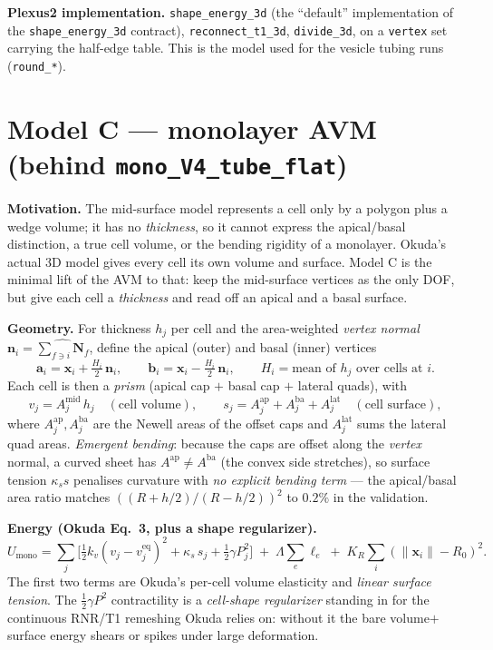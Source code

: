 \documentclass[11pt]{article}
\begin{document}
\textbf{Plexus2 implementation.} \texttt{shape\_energy\_3d} (the ``default'' implementation of the
\texttt{shape\_energy\_3d} contract), \texttt{reconnect\_t1\_3d}, \texttt{divide\_3d}, on a \texttt{vertex}
set carrying the half-edge table. This is the model used for the vesicle tubing runs (\texttt{round\_*}).

\section{Model C --- monolayer AVM (behind \texttt{mono\_V4\_tube\_flat})}
\label{sec:mono}
\textbf{Motivation.} The mid-surface model represents a cell only by a polygon plus a wedge volume; it has no
\emph{thickness}, so it cannot express the apical/basal distinction, a true cell volume, or the bending
rigidity of a monolayer. Okuda's actual 3D model \cite{okuda2015,okuda2018} gives every cell its own volume
and surface. Model C is the minimal lift of the AVM to that: keep the mid-surface vertices as the only DOF,
but give each cell a \emph{thickness} and read off an apical and a basal surface.

\textbf{Geometry.} For thickness $h_j$ per cell and the area-weighted \emph{vertex normal}
$\mathbf{n}_i=\widehat{\sum_{f\ni i}\mathbf{N}_f}$, define the apical (outer) and basal (inner) vertices
\begin{equation}
\mathbf{a}_i=\mathbf{x}_i+\tfrac{H_i}{2}\,\mathbf{n}_i,\qquad
\mathbf{b}_i=\mathbf{x}_i-\tfrac{H_i}{2}\,\mathbf{n}_i,\qquad
H_i=\text{mean of }h_j\text{ over cells at }i .
\end{equation}
Each cell is then a \emph{prism} (apical cap $+$ basal cap $+$ lateral quads), with
\begin{equation}
v_j=A^{\text{mid}}_j\,h_j\quad(\text{cell volume}),\qquad
s_j=A^{\text{ap}}_j+A^{\text{ba}}_j+A^{\text{lat}}_j\quad(\text{cell surface}),
\end{equation}
where $A^{\text{ap}}_j,A^{\text{ba}}_j$ are the Newell areas of the offset caps and $A^{\text{lat}}_j$ sums
the lateral quad areas. \emph{Emergent bending}: because the caps are offset along the \emph{vertex} normal,
a curved sheet has $A^{\text{ap}}\neq A^{\text{ba}}$ (the convex side stretches), so surface tension
$\kappa_s s$ penalises curvature with \emph{no explicit bending term} --- the apical/basal area ratio matches
$((R{+}h/2)/(R{-}h/2))^2$ to $0.2\%$ in the validation.

\textbf{Energy (Okuda Eq.~3, plus a shape regularizer).}
\begin{equation}
U_{\text{mono}}=\sum_j\Big[\tfrac12 k_v(v_j-v_j^{\text{eq}})^2+\kappa_s\,s_j+\tfrac12\gamma P_j^2\Big]
\;+\;\Lambda\!\sum_e\ell_e\;+\;K_R\!\sum_i(\|\mathbf{x}_i\|-R_0)^2 .
\label{eq:mono}
\end{equation}
The first two terms are Okuda's per-cell volume elasticity and \emph{linear surface tension}. The
$\tfrac12\gamma P^2$ contractility is a \emph{cell-shape regularizer} standing in for the continuous
RNR/T1 remeshing Okuda relies on: without it the bare volume$+$surface energy shears or spikes under large
deformation.
\end{document}
